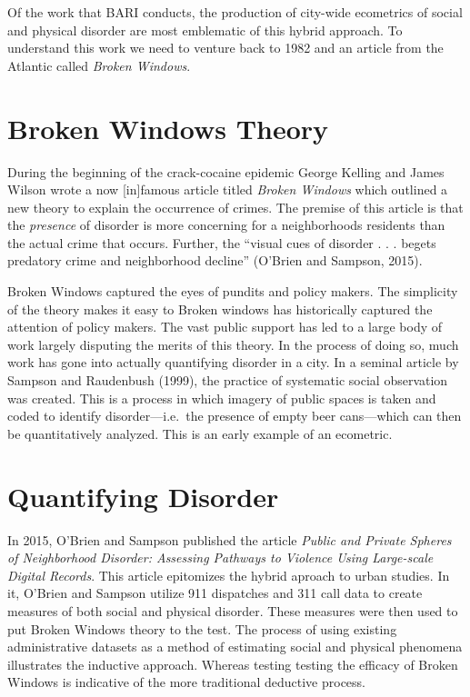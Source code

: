 \documentclass[
]{book}
\begin{document}
Of the work that BARI conducts, the production of city-wide ecometrics of social and physical disorder are most emblematic of this hybrid approach. To understand this work we need to venture back to 1982 and an article from the Atlantic called \emph{Broken Windows}.

\hypertarget{broken-windows-theory}{%
\section{Broken Windows Theory}\label{broken-windows-theory}}

During the beginning of the crack-cocaine epidemic George Kelling and James Wilson wrote a now {[}in{]}famous article titled \emph{Broken Windows} which outlined a new theory to explain the occurrence of crimes. The premise of this article is that the \emph{presence} of disorder is more concerning for a neighborhoods residents than the actual crime that occurs. Further, the ``visual cues of disorder . . . begets predatory crime and neighborhood decline'' (O'Brien and Sampson, 2015).

Broken Windows captured the eyes of pundits and policy makers. The simplicity of the theory makes it easy to Broken windows has historically captured the attention of policy makers. The vast public support has led to a large body of work largely disputing the merits of this theory. In the process of doing so, much work has gone into actually quantifying disorder in a city. In a seminal article by Sampson and Raudenbush (1999), the practice of systematic social observation was created. This is a process in which imagery of public spaces is taken and coded to identify disorder---i.e.~the presence of empty beer cans---which can then be quantitatively analyzed. This is an early example of an ecometric.

\hypertarget{quantifying-disorder}{%
\section{Quantifying Disorder}\label{quantifying-disorder}}

In 2015, O'Brien and Sampson published the article \emph{Public and Private Spheres of Neighborhood Disorder: Assessing Pathways to Violence Using Large-scale Digital Records}. This article epitomizes the hybrid aproach to urban studies. In it, O'Brien and Sampson utilize 911 dispatches and 311 call data to create measures of both social and physical disorder. These measures were then used to put Broken Windows theory to the test. The process of using existing administrative datasets as a method of estimating social and physical phenomena illustrates the inductive approach. Whereas testing testing the efficacy of Broken Windows is indicative of the more traditional deductive process.
\end{document}
